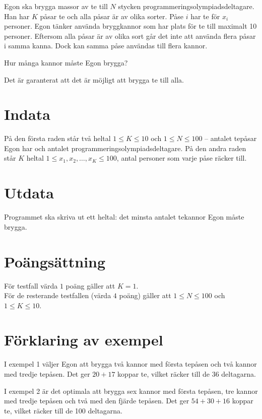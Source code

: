 Egon ska brygga massor av te till $N$ stycken programmeringsolympiadsdeltagare.
Han har $K$ påsar te och alla påsar är av olika sorter.
Påse $i$ har te för $x_i$ personer.
Egon tänker använda bryggkannor som har plats för te till maximalt 10 personer.
Eftersom alla påsar är av olika sort
går det inte att använda flera påsar i samma kanna.
Dock kan samma påse användas till flera kannor.

Hur många kannor måste Egon brygga?

Det är garanterat att det är möjligt att brygga te till alla.

\section*{Indata}
På den första raden står två heltal $1 \le K \le 10$ och $1 \le N \le 100$ 
 -- antalet tepåsar Egon har och antalet programmeringsolympiadsdeltagare. 
På den andra raden står $K$ heltal $1 \le x_1, x_2, \dots, x_K \le 100$,
antal personer som varje påse räcker till.

\section*{Utdata}
Programmet ska skriva ut ett heltal: det minsta antalet tekannor Egon måste brygga. 

\section*{Poängsättning}
För testfall värda $1$ poäng gäller att $K=1$. \\
För de resterande testfallen (värda $4$ poäng) gäller att $1\leq N\leq 100$ och $1\leq K\leq 10$.


\section*{Förklaring av exempel}
I exempel 1 väljer Egon att brygga två kannor med första tepåsen 
och två kannor med tredje tepåsen. Det ger $20+17$ koppar te, vilket
räcker till de 36 deltagarna.

I exempel 2 är det optimala att brygga sex kannor med första tepåsen,
tre kannor med tredje tepåsen och två med den fjärde tepåsen.
Det ger $54+30+16$ koppar te, vilket räcker till de 100  deltagarna.
